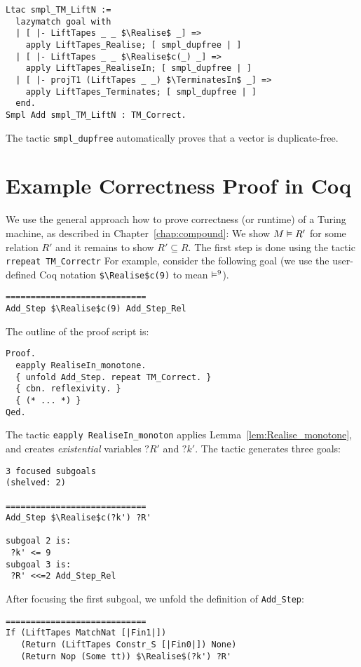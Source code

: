 \begin{lstlisting}
Ltac smpl_TM_LiftN :=
  lazymatch goal with
  | [ |- LiftTapes _ _ $\Realise$ _] =>
    apply LiftTapes_Realise; [ smpl_dupfree | ]
  | [ |- LiftTapes _ _ $\Realise$c(_) _] =>
    apply LiftTapes_RealiseIn; [ smpl_dupfree | ]
  | [ |- projT1 (LiftTapes _ _) $\TerminatesIn$ _] =>
    apply LiftTapes_Terminates; [ smpl_dupfree | ]
  end.
Smpl Add smpl_TM_LiftN : TM_Correct.
\end{lstlisting}
The tactic \lstinline!smpl_dupfree! automatically proves that a vector is duplicate-free.


\section{Example Correctness Proof in Coq}
\label{sec:coq-correctness}

We use the general approach how to prove correctness (or runtime) of a Turing machine, as described in Chapter~\ref{chap:compound}: We show
$M \mathrel{\vDash} R'$ for some relation $R'$ and it remains to show $R' \subseteq R$.  The first step is done using the tactic
\lstinline!rrepeat TM_Correctr!  For example, consider the following goal (we use the user-defined Coq notation \lstinline!$\Realise$c(9)! to mean
$\mathrel{\vDash^{9}}$).
\begin{lstlisting}
============================
Add_Step $\Realise$c(9) Add_Step_Rel
\end{lstlisting}
The outline of the proof script is:
\begin{lstlisting}
Proof.
  eapply RealiseIn_monotone.
  { unfold Add_Step. repeat TM_Correct. }
  { cbn. reflexivity. }
  { (* ... *) }
Qed.
\end{lstlisting}

The tactic \lstinline!eapply RealiseIn_monoton! applies Lemma~\ref{lem:Realise_monotone}, and creates \textit{existential} variables $?R'$ and $?k'$.
The tactic generates three goals:
\begin{lstlisting}
3 focused subgoals
(shelved: 2)
  
============================
Add_Step $\Realise$c(?k') ?R'

subgoal 2 is:
 ?k' <= 9
subgoal 3 is:
 ?R' <<=2 Add_Step_Rel
\end{lstlisting}

After focusing the first subgoal, we unfold the definition of \lstinline!Add_Step!:
\begin{lstlisting}
============================
If (LiftTapes MatchNat [|Fin1|])
   (Return (LiftTapes Constr_S [|Fin0|]) None)
   (Return Nop (Some tt)) $\Realise$(?k') ?R'
\end{lstlisting}

